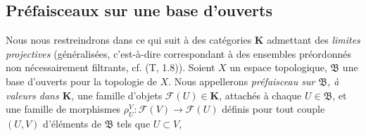 \subsection{Préfaisceaux sur une base d'ouverts}
\label{subsection:0.3.2-fr}

\begin{env}[3.2.1]
\label{0.3.2.1-fr}
Nous nous restreindrons dans ce qui suit à des catégories $\boldsymbol{K}$
admettant des \emph{limites projectives} (généralisées, c'est-à-dire
correspondant à des ensembles préordonnés non nécessairement filtrants,
cf. (T, 1.8)). Soient $X$ un espace topologique, $\mathfrak{B}$ une base
d'ouverts pour la topologie de $X$. Nous appellerons \emph{préfaisceau sur
$\mathfrak{B}$, à valeurs dans $\boldsymbol{K}$}, une famille d'objets
$\mathcal{F}(U)\in\boldsymbol{K}$, attachés à chaque $U\in\mathfrak{B}$, et une
famille de morphismes
$\rho_U^V:\mathcal{F}(V)\to\mathcal{F}(U)$ définis pour tout couple $(U,V)$
d'éléments de $\mathfrak{B}$ tels que $U\subset V$,



\end{env}
